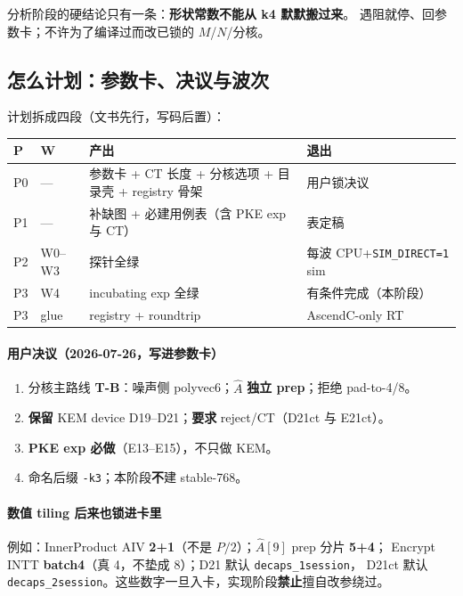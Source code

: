 \documentclass[UTF8,a4paper,11pt]{ctexart}
\theoremstyle{definition}
\theoremstyle{plain}
\theoremstyle{remark}
\numberwithin{figure}{section}
\numberwithin{table}{section}
\begin{document}
分析阶段的硬结论只有一条：\textbf{形状常数不能从 k4 默默搬过来}。
遇阻就停、回参数卡；不许为了编译过而改已锁的 $M$/$N$/分核。

\subsection{怎么计划：参数卡、决议与波次}
\label{sec:mlkem768-plan}

计划拆成四段（文书先行，写码后置）：

\begin{center}
\small
\begin{tabular}{@{}L{0.8cm}L{1.0cm}L{5.2cm}L{6cm}@{}}
  \toprule
  P & W & 产出 & 退出 \\
  \midrule
  P0 & — & 参数卡 + CT 长度 + 分核选项 + 目录壳 + registry 骨架 & 用户锁决议 \\
  P1 & — & 补缺图 + 必建用例表（含 PKE exp 与 CT） & 表定稿 \\
  P2 & W0--W3 & 探针全绿 & 每波 CPU+\texttt{SIM\_DIRECT=1} sim \\
  P3 & W4 & incubating exp 全绿 & 有条件完成（本阶段） \\
  P3 & glue & registry + roundtrip & AscendC-only RT \\
  \bottomrule
\end{tabular}
\end{center}

\paragraph{用户决议（2026-07-26，写进参数卡）}
\begin{enumerate}
  \item 分核主路线 \textbf{T-B}：噪声侧 polyvec6；$\hat A$ \textbf{独立 prep}；拒绝 pad-to-4/8。
  \item \textbf{保留} KEM device D19--D21；\textbf{要求} reject/CT（D21ct 与 E21ct）。
  \item \textbf{PKE exp 必做}（E13--E15），不只做 KEM。
  \item 命名后缀 \texttt{-k3}；本阶段\textbf{不}建 stable-768。
\end{enumerate}

\paragraph{数值 tiling 后来也锁进卡里}
例如：InnerProduct AIV \textbf{2+1}（不是 $P/2$）；$\hat A[9]$ prep 分片 \textbf{5+4}；
Encrypt INTT \textbf{batch4}（真 4，不垫成 8）；D21 默认 \texttt{decaps\_1session}，
D21ct 默认 \texttt{decaps\_2session}。这些数字一旦入卡，实现阶段\textbf{禁止}擅自改参绕过。
\end{document}
